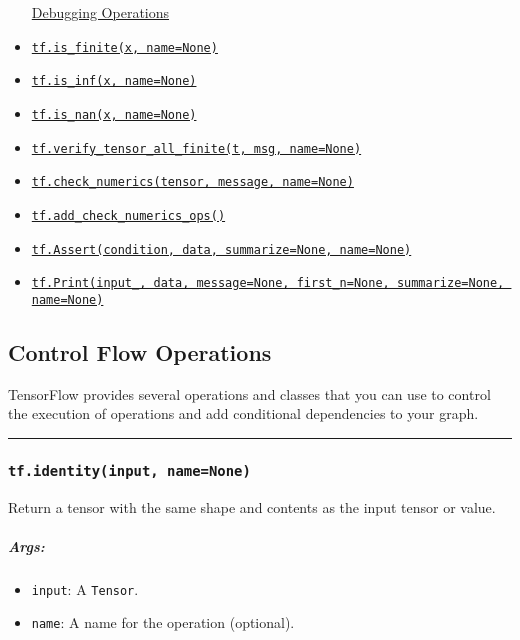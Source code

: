\begin{itemize}
  \protect\hyperlink{AUTOGENERATED-debugging-operations}{Debugging
  Operations}
\item
  \protect\hyperlink{isux5ffinite}{\texttt{tf.is\_finite(x,\ name=None)}}
\item
  \protect\hyperlink{isux5finf}{\texttt{tf.is\_inf(x,\ name=None)}}
\item
  \protect\hyperlink{isux5fnan}{\texttt{tf.is\_nan(x,\ name=None)}}
\item
  \protect\hyperlink{verifyux5ftensorux5fallux5ffinite}{\texttt{tf.verify\_tensor\_all\_finite(t,\ msg,\ name=None)}}
\item
  \protect\hyperlink{checkux5fnumerics}{\texttt{tf.check\_numerics(tensor,\ message,\ name=None)}}
\item
  \protect\hyperlink{addux5fcheckux5fnumericsux5fops}{\texttt{tf.add\_check\_numerics\_ops()}}
\item
  \protect\hyperlink{Assert}{\texttt{tf.Assert(condition,\ data,\ summarize=None,\ name=None)}}
\item
  \protect\hyperlink{Print}{\texttt{tf.Print(input\_,\ data,\ message=None,\ first\_n=None,\ summarize=None,\ name=None)}}
\end{itemize}

\subsection{Control Flow Operations }\label{control-flow-operations}

TensorFlow provides several operations and classes that you can use to
control the execution of operations and add conditional dependencies to
your graph.

\begin{center}\rule{0.5\linewidth}{\linethickness}\end{center}

\subsubsection{\texorpdfstring{\texttt{tf.identity(input,\ name=None)}
}{tf.identity(input, name=None) }}\label{tf.identityinput-namenone}

Return a tensor with the same shape and contents as the input tensor or
value.

\subparagraph{Args: }\label{args}

\begin{itemize}
\tightlist
\item
  \texttt{input}: A \texttt{Tensor}.
\item
  \texttt{name}: A name for the operation (optional).
\end{itemize}

